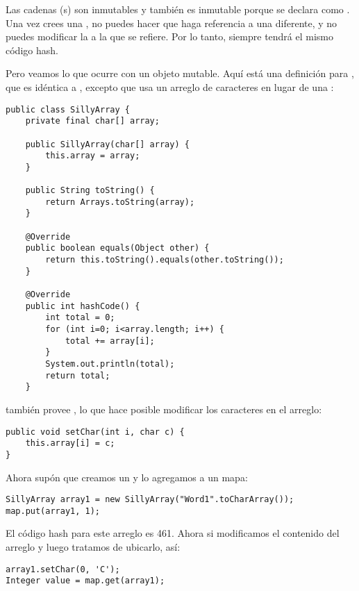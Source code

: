 \documentclass[12pt]{book}
\theoremstyle{exercise}
\begin{document}
Las cadenas (s) son inmutables y  también es
inmutable porque  se declara como . Una vez
crees una , no puedes hacer que  haga
referencia a una  diferente, y no puedes modificar la  a
la que se refiere. Por lo tanto, siempre tendrá el mismo código hash.


Pero veamos lo que ocurre con un objeto mutable. Aquí está una definición
para , que es idéntica a ,
excepto que usa un arreglo de caracteres en lugar de una :

\begin{verbatim}
public class SillyArray {
    private final char[] array;

    public SillyArray(char[] array) {
        this.array = array;
    }

    public String toString() {
        return Arrays.toString(array);
    }
    
    @Override
    public boolean equals(Object other) {
        return this.toString().equals(other.toString());
    }
    
    @Override
    public int hashCode() {
        int total = 0;
        for (int i=0; i<array.length; i++) {
            total += array[i];
        }
        System.out.println(total);
        return total;
    }
\end{verbatim}


 también provee , lo que hace posible
modificar los caracteres en el arreglo:

\begin{verbatim}
public void setChar(int i, char c) {
    this.array[i] = c;
}
\end{verbatim}

Ahora supón que creamos un  y lo agregamos a un mapa:

\begin{verbatim}
SillyArray array1 = new SillyArray("Word1".toCharArray());
map.put(array1, 1);
\end{verbatim}

El código hash para este arreglo es 461. Ahora si modificamos el contenido
del arreglo y luego tratamos de ubicarlo, así:

\begin{verbatim}
array1.setChar(0, 'C');
Integer value = map.get(array1);
\end{verbatim}
\end{document}
